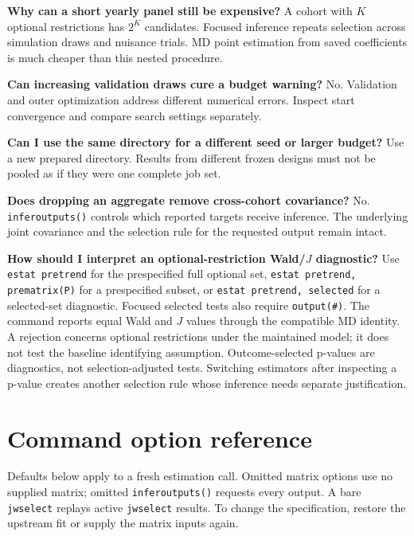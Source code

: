 \documentclass[11pt]{article}
\newcommand{\cmd}[1]{\texttt{#1}}
\begin{document}
\textbf{Why can a short yearly panel still be expensive?}
A cohort with $K$ optional restrictions has $2^K$ candidates. Focused inference
repeats selection across simulation draws and nuisance trials. MD point
estimation from saved coefficients is much cheaper than this nested procedure.

\textbf{Can increasing validation draws cure a budget warning?}
No. Validation and outer optimization address different numerical errors.
Inspect start convergence and compare search settings separately.

\textbf{Can I use the same directory for a different seed or larger budget?}
Use a new prepared directory. Results from different frozen designs must not
be pooled as if they were one complete job set.

\textbf{Does dropping an aggregate remove cross-cohort covariance?}
No. \cmd{inferoutputs()} controls which reported targets receive inference.
The underlying joint covariance and the selection rule for the requested
output remain intact.

\textbf{How should I interpret an optional-restriction Wald/$J$ diagnostic?}
Use \cmd{estat pretrend} for the prespecified full optional set,
\cmd{estat pretrend, prematrix(P)} for a prespecified subset, or
\cmd{estat pretrend, selected} for a selected-set diagnostic. Focused selected
tests also require \cmd{output(\#)}. The command reports equal Wald and $J$
values through the compatible MD identity. A rejection concerns optional
restrictions under the maintained model; it does not test the baseline
identifying assumption. Outcome-selected p-values are diagnostics, not
selection-adjusted tests. Switching estimators after inspecting a p-value
creates another selection rule whose inference needs separate justification.

\endgroup
\clearpage
\appendix
\section{Command option reference}
Defaults below apply to a fresh estimation call. Omitted matrix options use
no supplied matrix; omitted \cmd{inferoutputs()} requests every output.
A bare \cmd{jwselect} replays active \cmd{jwselect} results. To change the
specification, restore the upstream fit or supply the matrix inputs again.
\end{document}
